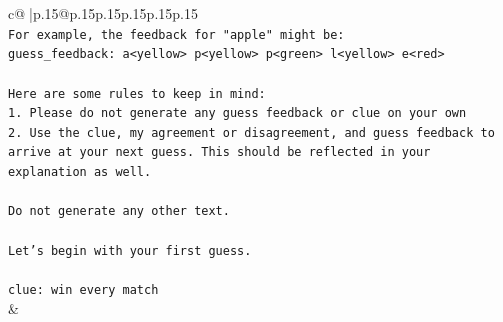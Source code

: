 \documentclass{article}
\begin{document}
{\begin{supertabular}{c@{$\;$}|p{.15\linewidth}@{}p{.15\linewidth}p{.15\linewidth}p{.15\linewidth}p{.15\linewidth}p{.15\linewidth}}
{{{\\ 
\texttt{For example, the feedback for "apple" might be:} \\
\texttt{guess\_feedback: a<yellow> p<yellow> p<green> l<yellow> e<red>} \\
\\ 
\texttt{Here are some rules to keep in mind:} \\
\texttt{1. Please do not generate any guess feedback or clue on your own} \\
\texttt{2. Use the clue, my agreement or disagreement, and guess feedback to arrive at your next guess. This should be reflected in your explanation as well.} \\
\\ 
\texttt{Do not generate any other text.} \\
\\ 
\texttt{Let's begin with your first guess.} \\
\\ 
\texttt{clue: win every match} \\
            }
        }
    }
    & \\ \\


\end{supertabular}}
\end{document}
